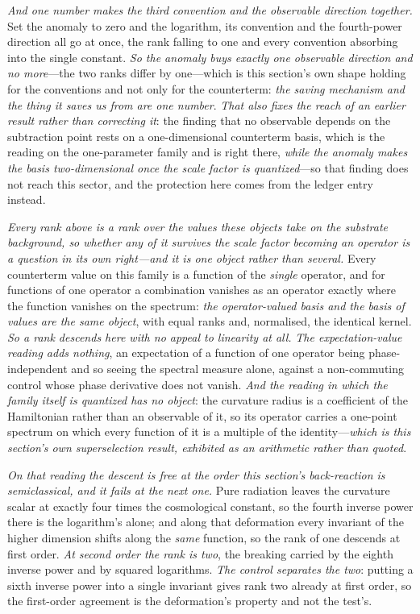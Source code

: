\documentclass[11pt,a4paper]{article}
\theoremstyle{plain}
\theoremstyle{definition}
\theoremstyle{remark}
\begin{document}
\emph{And one number makes the third convention and the observable direction together.} Set the anomaly to
zero and the logarithm, its convention and the fourth-power direction all go at once, the rank falling to one
and every convention absorbing into the single constant. \emph{So the anomaly buys exactly one observable
direction and no more}---the two ranks differ by one---which is this section's own shape holding for the
conventions and not only for the counterterm: \emph{the saving mechanism and the thing it saves us from are
one number}. \emph{That also fixes the reach of an earlier result rather than correcting it}: the finding
that no observable depends on the subtraction point rests on a one-dimensional counterterm basis, which is
the reading on the one-parameter family and is right there, \emph{while the anomaly makes the basis
two-dimensional once the scale factor is quantized}---so that finding does not reach this sector, and the
protection here comes from the ledger entry instead.

\emph{Every rank above is a rank over the values these objects take on the substrate background, so whether
any of it survives the scale factor becoming an operator is a question in its own right---and it is one
object rather than several.} Every counterterm value on this family is a function of the \emph{single}
operator, and for functions of one operator a combination vanishes as an operator exactly where the function
vanishes on the spectrum: \emph{the operator-valued basis and the basis of values are the same object}, with
equal ranks and, normalised, the identical kernel. \emph{So a rank descends here with no appeal to linearity
at all.} \emph{The expectation-value reading adds nothing}, an expectation of a function of one operator
being phase-independent and so seeing the spectral measure alone, against a non-commuting control whose
phase derivative does not vanish. \emph{And the reading in which the family itself is quantized has no
object}: the curvature radius is a coefficient of the Hamiltonian rather than an observable of it, so its
operator carries a one-point spectrum on which every function of it is a multiple of the
identity---\emph{which is this section's own superselection result, exhibited as an arithmetic rather than
quoted}.

\emph{On that reading the descent is free at the order this section's back-reaction is semiclassical, and it
fails at the next one.} Pure radiation leaves the curvature scalar at exactly four times the cosmological
constant, so the fourth inverse power there is the logarithm's alone; and along that deformation every
invariant of the higher dimension shifts along the \emph{same} function, so the rank of one descends at first
order. \emph{At second order the rank is two}, the breaking carried by the eighth inverse power and by
squared logarithms. \emph{The control separates the two}: putting a sixth inverse power into a single
invariant gives rank two already at first order, so the first-order agreement is the deformation's property
and not the test's.
\end{document}
